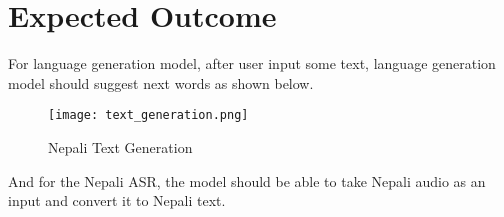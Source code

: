 \section{Expected Outcome}
For language generation model, after user input some text, language generation model should suggest next words as shown below.

\begin{figure}[H]
    \centering
    \texttt{[image: text\_generation.png]}
    \caption{Nepali Text Generation}
    \label{fig:Nepali Text Generation}
\end{figure}

And for the Nepali ASR, the model should be able to take Nepali audio as an input and convert it to Nepali text.

